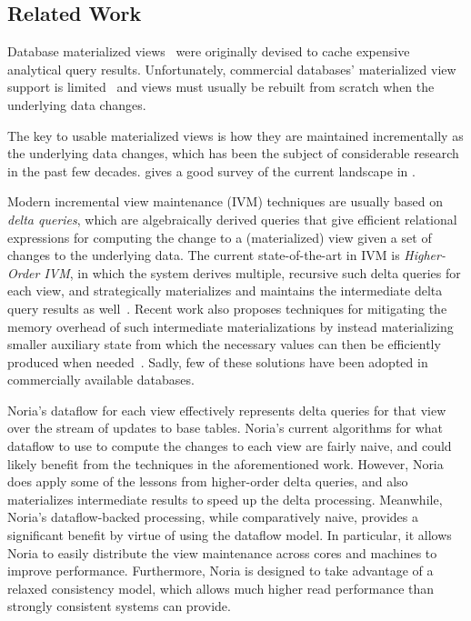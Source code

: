 \subsection{Related Work}

Database materialized views~\cite{gupta-view-selection,lee} were originally
devised to cache expensive analytical query results. Unfortunately, commercial
databases' materialized view support is
limited~\cite{materialized-view-selection-sql-server,mssql-materialized-view-restrictions-blog,
mssql-materialized-view-restrictions} and views must usually be rebuilt from
scratch when the underlying data changes.

The key to usable materialized views is how they are maintained incrementally as
the underlying data changes, which has been the subject of considerable research
in the past few decades. \citeauthor{materialized-survey} gives a good survey of
the current landscape in \cite{materialized-survey}.

Modern incremental view maintenance (IVM) techniques are usually based on
\textit{delta queries}, which are algebraically derived queries that give
efficient relational expressions for computing the change to a (materialized)
view given a set of changes to the underlying data. The current state-of-the-art
in IVM is \textit{Higher-Order IVM}, in which the system derives multiple,
recursive such delta queries for each view, and strategically materializes and
maintains the intermediate delta query results as well~\cite{dbtoaster, hotdog}.
Recent work also proposes techniques for mitigating the memory overhead of such
intermediate materializations by instead materializing smaller auxiliary state
from which the necessary values can then be efficiently produced when
needed~\cite{memory-efficient}. Sadly, few of these solutions have been adopted
in commercially available databases.

Noria's dataflow for each view effectively represents delta queries for that
view over the stream of updates to base tables. Noria's current algorithms for
what dataflow to use to compute the changes to each view are fairly naive, and
could likely benefit from the techniques in the aforementioned work. However,
Noria does apply some of the lessons from higher-order delta queries, and
also materializes intermediate results to speed up the delta processing.
Meanwhile, Noria's dataflow-backed processing, while comparatively naive,
provides a significant benefit by virtue of using the dataflow model. In
particular, it allows Noria to easily distribute the view maintenance across
cores and machines to improve performance. Furthermore, Noria is designed to
take advantage of a relaxed consistency model, which allows much higher read
performance than strongly consistent systems can provide.

